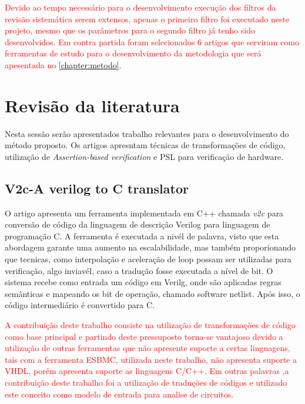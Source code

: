 \par
\textcolor{red}{Devido ao tempo necessário para o desenvolvimento execução dos filtros da revisão sistemática serem extensos, apenas o primeiro filtro foi executado neste projeto, mesmo que os parâmetros para o segundo filtro já tenho sido desenvolvidos. Em contra partida foram selecionados 6 artigos que serviram como ferramentas de estudo para o desenvolvimento da metodologia que será apesentada no \autoref{chapter:metodo}.}

\section{Revisão da literatura}
Nesta sessão serão apresentados trabalho relevantes para o desenvolvimento do método proposto. Os artigos apresntam técnicas de transformações de código, utilização de \textit{Assertion-based verification} e PSL para verificação de hardware.

\subsection{V2c-A verilog to C translator}
O artigo apresenta um ferramenta implementada em C++ chamada \textit{v2c} para conversão de código da linguagem de descrição Verilog para linguagem de programação C. A ferramenta é executada a nivél de palavra, visto que esta abordagem garante uma aumento na escalabilidade, mas também proporionando que tecnicas, como interpolação e aceleração de loop possam ser utilizadas para verificação, algo inviavél, caso a tradução fosse executada a nível de bit. O sistema recebe como entrada um código em Verilg, onde são aplicadas regras semânticas e mapeando os bit de operação, chamado software netlist. Após isso, o código intermediário é convertido para C\cite{mukherjee2016v2c}.

\par
\textcolor{red}{A contribuição deste trabalho consiste na utilização de transformações de código como base principal e partindo deste pressuposto torna-se vantajoso devido a utilização de outras ferramentas que não apresente suporte a certas linguagens, tais com a ferramenta ESBMC, utilizada neste trabalho, não apresenta suporte a VHDL, porém apresenta suporte as linguagens C/C++. Em outras palavras ,a contribuição deste trabalho foi a utilização de traduções de códigos e utilizado este conceito como modelo de entrada para analise de circuitos.}

